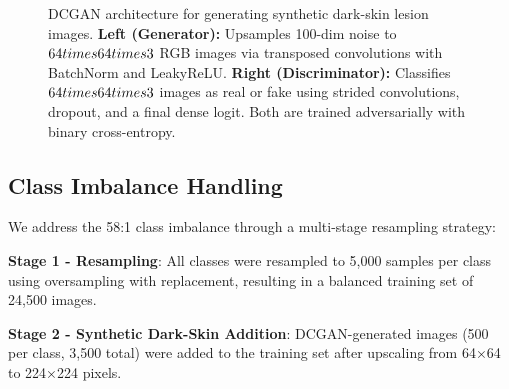 \documentclass[10pt, twocolumn, letterpaper]{article}
\begin{document}
\begin{figure}[t!]
\caption{DCGAN architecture for generating synthetic dark-skin lesion images. \textbf{Left (Generator):} Upsamples 100-dim noise to $64\\times64\\times3$ RGB images via transposed convolutions with BatchNorm and LeakyReLU. \textbf{Right (Discriminator):} Classifies $64\\times64\\times3$ images as real or fake using strided convolutions, dropout, and a final dense logit. Both are trained adversarially with binary cross-entropy.}
\label{fig:gan}
\end{figure}

\subsection{Class Imbalance Handling}
We address the 58:1 class imbalance through a multi-stage resampling strategy:

\textbf{Stage 1 - Resampling}: All classes were resampled to 5,000 samples per class using oversampling with replacement, resulting in a balanced training set of 24,500 images.

\textbf{Stage 2 - Synthetic Dark-Skin Addition}: DCGAN-generated images (500 per class, 3,500 total) were added to the training set after upscaling from 64×64 to 224×224 pixels.
\end{document}
